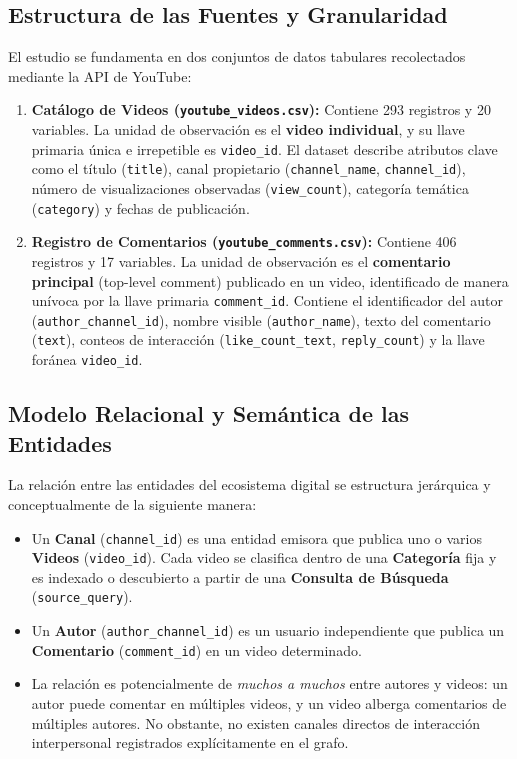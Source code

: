 \documentclass[11pt,a4paper]{article}
\begin{document}
\subsection{Estructura de las Fuentes y Granularidad}
El estudio se fundamenta en dos conjuntos de datos tabulares recolectados mediante la API de YouTube:
\begin{enumerate}
    \item \textbf{Catálogo de Videos (\texttt{youtube\_videos.csv}):} Contiene 293 registros y 20 variables. La unidad de observación es el \textbf{video individual}, y su llave primaria única e irrepetible es \texttt{video\_id}. El dataset describe atributos clave como el título (\texttt{title}), canal propietario (\texttt{channel\_name}, \texttt{channel\_id}), número de visualizaciones observadas (\texttt{view\_count}), categoría temática (\texttt{category}) y fechas de publicación.
    \item \textbf{Registro de Comentarios (\texttt{youtube\_comments.csv}):} Contiene 406 registros y 17 variables. La unidad de observación es el \textbf{comentario principal} (top-level comment) publicado en un video, identificado de manera unívoca por la llave primaria \texttt{comment\_id}. Contiene el identificador del autor (\texttt{author\_channel\_id}), nombre visible (\texttt{author\_name}), texto del comentario (\texttt{text}), conteos de interacción (\texttt{like\_count\_text}, \texttt{reply\_count}) y la llave foránea \texttt{video\_id}.
\end{enumerate}

\subsection{Modelo Relacional y Semántica de las Entidades}
La relación entre las entidades del ecosistema digital se estructura jerárquica y conceptualmente de la siguiente manera:
\begin{itemize}
    \item Un \textbf{Canal} (\texttt{channel\_id}) es una entidad emisora que publica uno o varios \textbf{Videos} (\texttt{video\_id}). Cada video se clasifica dentro de una \textbf{Categoría} fija y es indexado o descubierto a partir de una \textbf{Consulta de Búsqueda} (\texttt{source\_query}).
    \item Un \textbf{Autor} (\texttt{author\_channel\_id}) es un usuario independiente que publica un \textbf{Comentario} (\texttt{comment\_id}) en un video determinado.
    \item La relación es potencialmente de \textit{muchos a muchos} entre autores y videos: un autor puede comentar en múltiples videos, y un video alberga comentarios de múltiples autores. No obstante, no existen canales directos de interacción interpersonal registrados explícitamente en el grafo.
\end{itemize}
\end{document}
